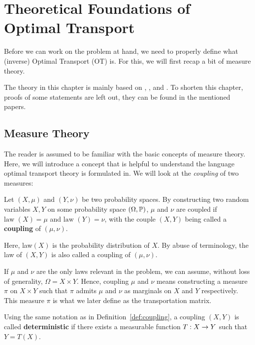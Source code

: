 \chapter[Theoretical Foundations of Optimal Transport]{Theoretical Foundations of \\Optimal Transport}
\label{ch:2}
Before we can work on the problem at hand, we need to properly define what (inverse) Optimal Transport (OT) is. For this, we will first recap a bit of measure theory. \par 
The theory in this chapter is mainly based on \citet{villani2008}, \citet{benamou1998}, \citet{peyre2020} and \citet{chiu2022}. To shorten this chapter, proofs of some statements are left out, they can be found in the mentioned papers.\par

\section{Measure Theory}
The reader is assumed to be familiar with the basic concepts of measure theory. Here, we will introduce a concept that is helpful to understand the language optimal transport theory is formulated in. We will look at the \textit{coupling} of two measures: 
\vspace{0.3cm}
\begin{definition}[Coupling]
	Let $(X, \mu)$ and $(Y, \nu)$ be two probability spaces. By constructing two random variables $X, Y$ on some probability space $(\Omega, \P)$, $\mu$ and $\nu$ are coupled if $\text{law } (X) = \mu$ and $\text{law }(Y) = \nu$, with the couple $(X,Y)$ being called a \textbf{coupling} of $(\mu, \nu)$. 
	\label{def:coupling}
\end{definition}
Here, law$(X)$ is the probability distribution of $X$. By abuse of terminology, the law of $(X,Y)$ is also called a coupling of $(\mu, \nu)$. \par 
If $\mu$ and $\nu$ are the only laws relevant in the problem, we can assume, without loss of generality, $\Omega = X \times Y$. Hence, coupling $\mu$ and $\nu$ means constructing a measure $\pi$ on $X \times Y$ such that $\pi$ admits $\mu$ and $\nu$ as marginals on $X$ and $Y$ respectively. This measure $\pi$ is what we later define as the transportation matrix. 
\vspace{0.3cm}
\begin{definition}
	Using the same notation as in Definition~\ref{def:coupling}, a coupling $(X, Y)$ is called \textbf{deterministic} if there exists a measurable function $T: X \ra Y$ such that $Y = T(X)$. 
	\label{def:detcoup}
\end{definition}
